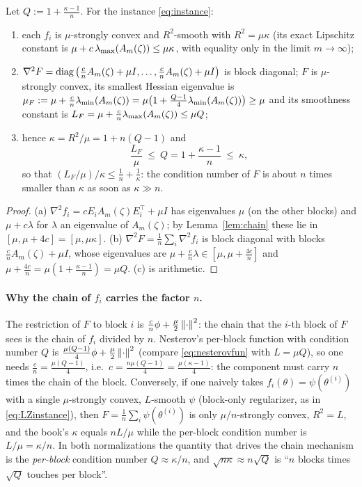 \begin{proposition}
\label{prop:constants}
Let $Q:=1+\frac{\kappa-1}{n}$. For the instance \eqref{eq:instance}:
\begin{enumerate}[nosep,label=(\alph*)]
\item each $f_i$ is $\mu$-strongly convex and $R^2$-smooth with $R^2=\mu\kappa$ (its exact Lipschitz constant is $\mu+c\,\lambda_{\max}(A_m(\zeta))\le\mu\kappa$, with equality only in the limit $m\to\infty$);
\item $\nabla^2F=\operatorname{diag}\big(\tfrac cnA_m(\zeta)+\mu I,\dots,\tfrac cnA_m(\zeta)+\mu I\big)$ is block diagonal; $F$ is $\mu$-strongly convex, its smallest Hessian eigenvalue is $\mu_F:=\mu+\frac cn\lambda_{\min}(A_m(\zeta))=\mu\big(1+\frac{Q-1}{4}\lambda_{\min}(A_m(\zeta))\big)\ge\mu$ and its smoothness constant is $L_F=\mu+\frac cn\lambda_{\max}(A_m(\zeta))\le\mu Q$;
\item hence $\kappa=R^2/\mu=1+n(Q-1)$ and
\begin{equation}
\label{ineq:LF}
\frac{L_F}{\mu}\ \le\ Q=1+\frac{\kappa-1}{n}\ \le\ \kappa ,
\end{equation}
so that $(L_F/\mu)/\kappa\le\frac1n+\frac1\kappa$: the condition number of $F$ is about $n$ times smaller than $\kappa$ as soon as $\kappa\gg n$.
\end{enumerate}
\end{proposition}

\begin{proof}
(a) $\nabla^2f_i=cE_iA_m(\zeta)E_i^\top+\mu I$ has eigenvalues $\mu$ (on the other blocks) and $\mu+c\lambda$ for $\lambda$ an eigenvalue of $A_m(\zeta)$; by Lemma~\ref{lem:chain} these lie in $[\mu,\mu+4c]=[\mu,\mu\kappa]$. (b) $\nabla^2F=\frac1n\sum_i\nabla^2f_i$ is block diagonal with blocks $\frac cnA_m(\zeta)+\mu I$, whose eigenvalues are $\mu+\frac cn\lambda\in[\mu,\mu+\frac{4c}n]$ and $\mu+\frac{4c}{n}=\mu(1+\frac{\kappa-1}{n})=\mu Q$. (c) is arithmetic.
\end{proof}

\paragraph{Why the chain of $f_i$ carries the factor $n$.} The restriction of $F$ to block $i$ is $\frac cn\phi+\frac\mu2\left\|\cdot\right\|^2$: the chain that the $i$-th block of $F$ sees is the chain of $f_i$ divided by $n$. Nesterov's per-block function with condition number $Q$ is $\frac{\mu(Q-1)}4\phi+\frac\mu2\left\|\cdot\right\|^2$ (compare \eqref{eq:nesterovfun} with $L=\mu Q$), so one needs $\frac cn=\frac{\mu(Q-1)}4$, i.e.\ $c=\frac{n\mu(Q-1)}{4}=\frac{\mu(\kappa-1)}4$: the component must carry $n$ times the chain of the block. Conversely, if one naively takes $f_i(\theta)=\psi(\theta^{(i)})$ with a single $\mu$-strongly convex, $L$-smooth $\psi$ (block-only regularizer, as in \eqref{eq:LZinstance}), then $F=\frac1n\sum_i\psi(\theta^{(i)})$ is only $\mu/n$-strongly convex, $R^2=L$, and the book's $\kappa$ equals $nL/\mu$ while the per-block condition number is $L/\mu=\kappa/n$. In both normalizations the quantity that drives the chain mechanism is the \emph{per-block} condition number $Q\approx\kappa/n$, and $\sqrt{n\kappa}\approx n\sqrt Q$ is ``$n$ blocks times $\sqrt Q$ touches per block''.

